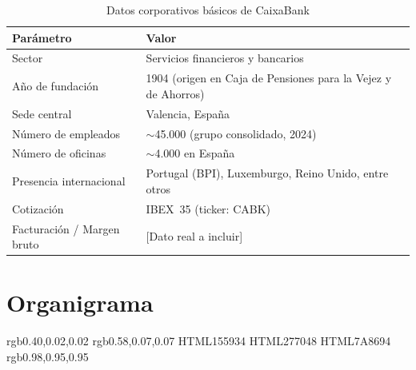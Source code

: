 \begin{table}[H]
  \centering
  \caption{Datos corporativos básicos de CaixaBank}
  \begin{tabularx}{\textwidth}{lX}
    \toprule
    \textbf{Parámetro}           & \textbf{Valor} \\
    \midrule
    Sector                       & Servicios financieros y bancarios \\
    Año de fundación             & 1904 (origen en Caja de Pensiones para la Vejez y de Ahorros) \\
    Sede central                 & Valencia, España \\
    Número de empleados          & $\sim$45.000 (grupo consolidado, 2024) \\
    Número de oficinas           & $\sim$4.000 en España \\
    Presencia internacional      & Portugal (BPI), Luxemburgo, Reino Unido, entre otros \\
    Cotización                   & IBEX~35 (ticker: CABK) \\
    Facturación / Margen bruto   & [Dato real a incluir] \\
    \bottomrule
  \end{tabularx}
\end{table}

\section{Organigrama}

\definecolor{cCEO} {rgb}{0.40,0.02,0.02}
\definecolor{cL1}  {rgb}{0.58,0.07,0.07}
\definecolor{cGr}  {HTML}{155934}
\definecolor{cGr2} {HTML}{277048}
\definecolor{cEmp} {HTML}{7A8694}
\definecolor{cBg}  {rgb}{0.98,0.95,0.95}

\newcommand{\nc}[5]{%
  \fill[black!8,rounded corners=2.5pt](#1+.07,{-(#2)-.07})rectangle(#1+2.94+.07,{-(#2)-2.20-.07});
  \fill[cCard,rounded corners=2.5pt,draw=cBord,line width=.35pt](#1,{-(#2)})rectangle(#1+2.94,{-(#2)-2.20});
  \fill[#3,rounded corners=2.5pt](#1,{-(#2)})rectangle(#1+2.94,{-(#2)-.22});
  \fill[#3](#1,{-(#2)-.11})rectangle(#1+2.94,{-(#2)-.22});
  \fill[#3!22,draw=#3!55,line width=.4pt](#1+.26,{-(#2)-.58})circle(.22);
  \node[anchor=north west,text width=2.32cm,inner sep=0pt,align=left,
        font=\fontsize{5.5}{6.5}\bfseries\sffamily\selectfont,text=cDark]
    at(#1+.54,{-(#2)-.28}){#4};
  \def\tmpS{#5}\ifx\tmpS\empty\else
  \node[anchor=south west,text width=2.78cm,inner sep=0pt,align=left,
        font=\fontsize{4.6}{5.4}\sffamily\selectfont,text=cGray]
    at(#1+.08,{-(#2)-2.10}){#5};\fi}

